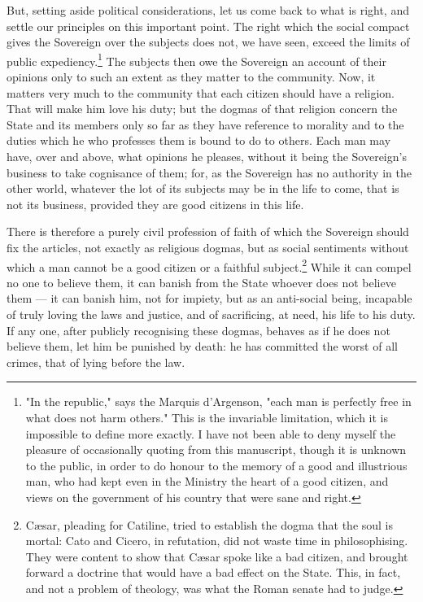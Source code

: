\documentclass[12pt]{book}
\begin{document}
But, setting aside political considerations, let us come back to what is right, and settle our principles on this important point. The right which the social compact gives the Sovereign over the subjects does not, we have seen, exceed the limits of public expediency.\footnote{"In the republic," says the Marquis d'Argenson, "each man is perfectly free in what does not harm others." This is the invariable limitation, which it is impossible to define more exactly. I have not been able to deny myself the pleasure of occasionally quoting from this manuscript, though it is unknown to the public, in order to do honour to the memory of a good and illustrious man, who had kept even in the Ministry the heart of a good citizen, and views on the government of his country that were sane and right.} The subjects then owe the Sovereign an account of their opinions only to such an extent as they matter to the community. Now, it matters very much to the community that each citizen should have a religion. That will make him love his duty; but the dogmas of that religion concern the State and its members only so far as they have reference to morality and to the duties which he who professes them is bound to do to others. Each man may have, over and above, what opinions he pleases, without it being the Sovereign's business to take cognisance of them; for, as the Sovereign has no authority in the other world, whatever the lot of its subjects may be in the life to come, that is not its business, provided they are good citizens in this life.

There is therefore a purely civil profession of faith of which the Sovereign should fix the articles, not exactly as religious dogmas, but as social sentiments without which a man cannot be a good citizen or a faithful subject.\footnote{Cæsar, pleading for Catiline, tried to establish the dogma that the soul is mortal: Cato and Cicero, in refutation, did not waste time in philosophising. They were content to show that Cæsar spoke like a bad citizen, and brought forward a doctrine that would have a bad effect on the State. This, in fact, and not a problem of theology, was what the Roman senate had to judge.} While it can compel no one to believe them, it can banish from the State whoever does not believe them — it can banish him, not for impiety, but as an anti-social being, incapable of truly loving the laws and justice, and of sacrificing, at need, his life to his duty. If any one, after publicly recognising these dogmas, behaves as if he does not believe them, let him be punished by death: he has committed the worst of all crimes, that of lying before the law.
\end{document}
